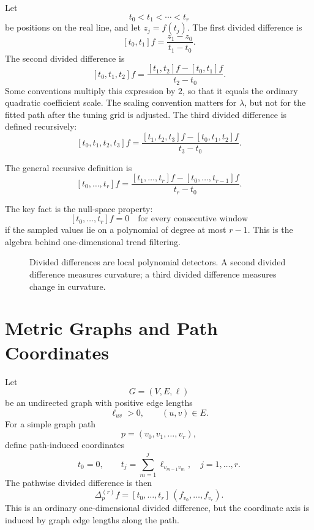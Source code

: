 \documentclass[11pt]{article}
\begin{document}
Let
\[
  t_0 < t_1 < \cdots < t_r
\]
be positions on the real line, and let \(z_j=f(t_j)\).  The first divided
difference is
\[
  [t_0,t_1]f
  =
  \frac{z_1-z_0}{t_1-t_0}.
\]
The second divided difference is
\[
  [t_0,t_1,t_2]f
  =
  \frac{
    [t_1,t_2]f - [t_0,t_1]f
  }{
    t_2-t_0
  }.
\]
Some conventions multiply this expression by \(2\), so that it equals the
ordinary quadratic coefficient scale.  The scaling convention matters for
\(\lambda\), but not for the fitted path after the tuning grid is adjusted.
The third divided difference is defined recursively:
\[
  [t_0,t_1,t_2,t_3]f
  =
  \frac{
    [t_1,t_2,t_3]f - [t_0,t_1,t_2]f
  }{
    t_3-t_0
  }.
\]

The general recursive definition is
\[
  [t_0,\ldots,t_r]f
  =
  \frac{
    [t_1,\ldots,t_r]f - [t_0,\ldots,t_{r-1}]f
  }{
    t_r-t_0
  }.
\]

The key fact is the null-space property:
\[
  [t_0,\ldots,t_r]f=0
  \quad\text{for every consecutive window}
\]
if the sampled values lie on a polynomial of degree at most \(r-1\).
This is the algebra behind one-dimensional trend filtering.

\begin{figure}[ht]
\centering
{}
\caption{Divided differences are local polynomial detectors.  A second divided
difference measures curvature; a third divided difference measures change in
curvature.}
\end{figure}

\section{Metric Graphs and Path Coordinates}

Let
\[
  G=(V,E,\ell)
\]
be an undirected graph with positive edge lengths
\[
  \ell_{uv}>0,\qquad (u,v)\in E.
\]
For a simple graph path
\[
  p=(v_0,v_1,\ldots,v_r),
\]
define path-induced coordinates
\[
  t_0=0,\qquad
  t_j=\sum_{m=1}^j \ell_{v_{m-1}v_m},\quad j=1,\ldots,r.
\]
The pathwise divided difference is then
\[
  \Delta^{(r)}_p f
  =
  [t_0,\ldots,t_r]\,
  (f_{v_0},\ldots,f_{v_r}).
\]
This is an ordinary one-dimensional divided difference, but the coordinate
axis is induced by graph edge lengths along the path.
\end{document}
